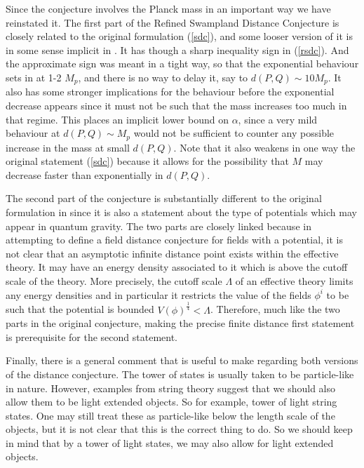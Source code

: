 \documentclass[11pt,a4paper]{article}
\numberwithin{equation}{section}
\numberwithin{table}{section}\setlength{\multlinegap}{25pt}
\begin{document}
Since the conjecture involves the Planck mass in an important way we have reinstated it. The first part of the Refined Swampland Distance Conjecture is closely related to the original formulation (\ref{sdc}), and some looser version of it is in some sense implicit in \cite{Ooguri:2006in}. It has though a sharp inequality sign in (\ref{rsdc}). And the approximate sign was meant in a tight way, so that the exponential behaviour sets in at 1-2 $M_p$, and there is no way to delay it, say to $d \left( P,Q \right) \sim 10 M_p$. It also has some stronger implications for the behaviour before the exponential decrease appears since it must not be such that the mass increases too much in that regime. This places an implicit lower bound on $\alpha$, since a very mild behaviour at $d \left( P,Q \right) \sim M_p$ would not be sufficient to counter any possible increase in the mass at small $d \left( P,Q \right)$. Note that it also weakens in one way the original statement (\ref{sdc}) because it allows for the possibility that $M$ may decrease faster than exponentially in $d \left( P,Q \right)$.

The second part of the conjecture is substantially different to the original formulation in \cite{Ooguri:2006in} since it is also a statement about the type of potentials which may appear in quantum gravity. The two parts are closely linked because in attempting to define a field distance conjecture for fields with a potential, it is not clear that an asymptotic infinite distance point exists within the effective theory. It may have an energy density associated to it which is above the cutoff scale of the theory. More precisely, the cutoff scale $\Lambda$ of an effective theory limits any energy densities and in particular it restricts the value of the fields $\phi^i$ to be such that the potential is bounded $V\left( \phi \right)^{\frac14} < \Lambda$. Therefore, much like the two parts in the original conjecture, making the precise finite distance first statement is prerequisite for the second statement. 

Finally, there is a general comment that is useful to make regarding both versions of the distance conjecture. The tower of states is usually taken to be particle-like in nature. However, examples from string theory suggest that we should also allow them to be light extended objects. So for example, tower of light string states. One may still treat these as particle-like below the length scale of the objects, but it is not clear that this is the correct thing to do. So we should keep in mind that by a tower of light states, we may also allow for light extended objects.  
\end{document}

